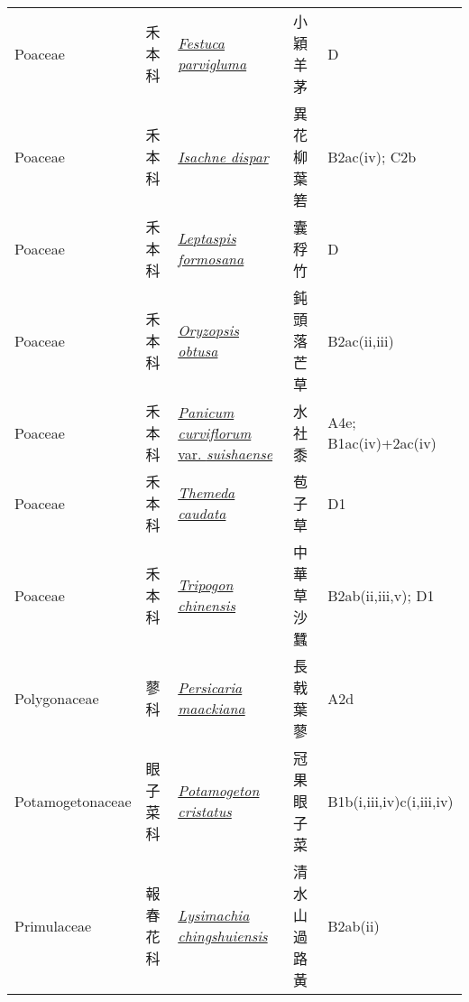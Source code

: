 {\begin{longtable}{p{2.5cm}p{2.5cm}p{4.5cm}p{2.5cm}p{3cm}}
    Poaceae & 禾本科 & \href{http://www.theplantlist.org/tpl1.1/search?q=Festuca+parvigluma}{\textit{Festuca parvigluma} } & 小穎羊茅 & D \index{Festuca@\textit{Festuca}!parvigluma@\textit{parvigluma}}  \index{小穎羊茅} \\
    Poaceae & 禾本科 & \href{http://www.theplantlist.org/tpl1.1/search?q=Isachne+dispar}{\textit{Isachne dispar} } & 異花柳葉箬 & B2ac(iv); C2b \index{Isachne@\textit{Isachne}!dispar@\textit{dispar}}  \index{異花柳葉箬} \\
    Poaceae & 禾本科 & \href{http://www.theplantlist.org/tpl1.1/search?q=Leptaspis+formosana}{\textit{Leptaspis formosana} } & 囊稃竹 & D \index{Leptaspis@\textit{Leptaspis}!formosana@\textit{formosana}}  \index{囊稃竹} \\
    Poaceae & 禾本科 & \href{http://www.theplantlist.org/tpl1.1/search?q=Oryzopsis+obtusa}{\textit{Oryzopsis obtusa} } & 鈍頭落芒草 & B2ac(ii,iii) \index{Oryzopsis@\textit{Oryzopsis}!obtusa@\textit{obtusa}}  \index{鈍頭落芒草} \\
    Poaceae & 禾本科 & \href{http://www.theplantlist.org/tpl1.1/search?q=Panicum+curviflorum+var.+suishaense}{\textit{Panicum curviflorum} var. \textit{suishaense} } & 水社黍 & A4e; B1ac(iv)+2ac(iv) \index{Panicum@\textit{Panicum}!curviflorum@\textit{curviflorum}!var. suishaense@var. \textit{suishaense}}  \index{水社黍} \\
    Poaceae & 禾本科 & \href{http://www.theplantlist.org/tpl1.1/search?q=Themeda+caudata}{\textit{Themeda caudata} } & 苞子草 & D1 \index{Themeda@\textit{Themeda}!caudata@\textit{caudata}}  \index{苞子草} \\
    Poaceae & 禾本科 & \href{http://www.theplantlist.org/tpl1.1/search?q=Tripogon+chinensis}{\textit{Tripogon chinensis} } & 中華草沙蠶 & B2ab(ii,iii,v); D1 \index{Tripogon@\textit{Tripogon}!chinensis@\textit{chinensis}}  \index{中華草沙蠶} \\
    Polygonaceae & 蓼科 & \href{http://www.theplantlist.org/tpl1.1/search?q=Persicaria+maackiana}{\textit{Persicaria maackiana} } & 長戟葉蓼 & A2d \index{Persicaria@\textit{Persicaria}!maackiana@\textit{maackiana}}  \index{長戟葉蓼} \\
    Potamogetonaceae & 眼子菜科 & \href{http://www.theplantlist.org/tpl1.1/search?q=Potamogeton+cristatus}{\textit{Potamogeton cristatus} } & 冠果眼子菜 & B1b(i,iii,iv)c(i,iii,iv) \index{Potamogeton@\textit{Potamogeton}!cristatus@\textit{cristatus}}  \index{冠果眼子菜} \\
    Primulaceae & 報春花科 & \href{http://www.theplantlist.org/tpl1.1/search?q=Lysimachia+chingshuiensis}{\textit{Lysimachia chingshuiensis} } & 清水山過路黃 & B2ab(ii) \index{Lysimachia@\textit{Lysimachia}!chingshuiensis@\textit{chingshuiensis}}  \index{清水山過路黃} \\

\end{longtable}}
